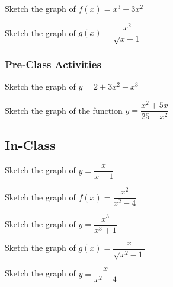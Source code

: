 \documentclass[notes]{subfiles}
\begin{document}
		\begin{ex}
			Sketch the graph of $f(x) = x^3 + 3x^2$
		\end{ex}

		\begin{ex}
			Sketch the graph of $g(x) = \dfrac{x^2}{\sqrt{x+1}}$
		\end{ex}
			\newpage
			
	\subsubsection*{Pre-Class Activities}
		\begin{ex}
			Sketch the graph of $y=2+3x^2-x^3$
		\end{ex}
						
		\begin{ex}
			Sketch the graph of the function $y = \dfrac{x^2 + 5x}{25-x^2}$
		\end{ex}

		
			\newpage
		
	\subsection*{In-Class}
		\begin{ex}
			Sketch the graph of $y = \dfrac{x}{x-1}$
		\end{ex}

			
			\newpage
			
		\begin{ex}
			Sketch the graph of $f(x) = \dfrac{x^2}{x^2-4}$
		\end{ex}

			
			\newpage
			
		\begin{ex}
			Sketch the graph of $y = \dfrac{x^3}{x^3+1}$
		\end{ex}
			
		\begin{ex}
			Sketch the graph of $g(x) = \dfrac{x}{\sqrt{x^2-1}}$
		\end{ex}

			
			\newpage
			
		\begin{ex}
			Sketch the graph of $y=\dfrac{x}{x^2-4}$
		\end{ex}

		
				\newpage
				
\end{document}
